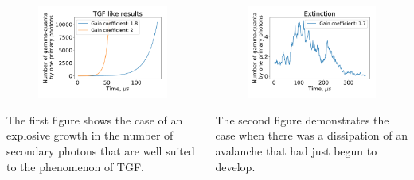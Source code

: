 \documentclass[8pt,pdf,hyperref={unicode}]{beamer}
\begin{document}
\begin{frame}
    \frametitle{}
\begin{columns}
	\begin{column}{0.5\textwidth}
		\begin{figure}[htb]
		\centering
		\includegraphics[width=1\columnwidth]{proofTGF.pdf}
		\end{figure}
		The first figure shows the case of an explosive growth in the number of secondary photons that are well suited to the phenomenon of TGF.
	\end{column}
	\begin{column}{0.5\textwidth}
		\begin{figure}[htb]
			\centering
			\includegraphics[width=1\columnwidth]{Extinction.pdf}
		\end{figure}
		The second figure demonstrates the case when there was a dissipation of an avalanche that had just begun to develop.

	\end{column}
\end{columns}
    
\end{frame}
\end{document}
